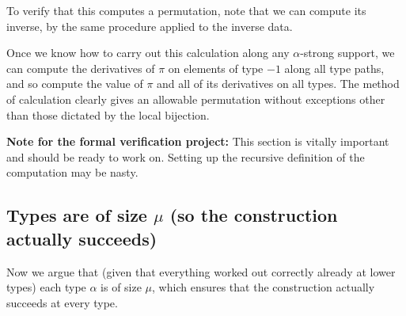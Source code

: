 \documentclass[112pt]{article}
\begin{document}
\begin{description}
To verify that this computes a permutation, note that we can compute its inverse, by the same procedure applied to the inverse data.

Once we know how to carry out this calculation along any $\alpha$-strong support, we can compute the derivatives of $\pi$ on elements of type $-1$  along all type paths, and so compute the value of $\pi$ and all of its derivatives on all types.  The method of calculation clearly gives an allowable permutation without exceptions other than those dictated by the local bijection.

\end{description}
{\bf Note for the formal verification project:}  This section is vitally important and should be ready to work on.  Setting up the recursive definition of the computation may be nasty.

\newpage
\subsection{Types are of size $\mu$ (so the construction actually succeeds)}

Now we argue that (given that everything worked out correctly already at lower types) each type $\alpha$ is of size $\mu$, which ensures
that the construction actually succeeds at every type.
\end{document}
